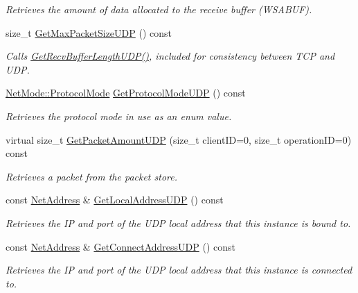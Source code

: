 \begin{DoxyCompactItemize}
\begin{DoxyCompactList}\small\item\em Retrieves the amount of data allocated to the receive buffer (WSABUF). \item\end{DoxyCompactList}\item 
size\_\-t \hyperlink{class_net_instance_u_d_p_a2b6f907521cb66fd707d069a62f7c36e}{GetMaxPacketSizeUDP} () const 
\begin{DoxyCompactList}\small\item\em Calls \hyperlink{class_net_instance_u_d_p_a4467dd45f0ae82b2c4721a3b04dd3746}{GetRecvBufferLengthUDP()}, included for consistency between TCP and UDP. \item\end{DoxyCompactList}\item 
\hyperlink{class_net_mode_a43cfa55ee6a4db66a8d7d6c27f766964}{NetMode::ProtocolMode} \hyperlink{class_net_instance_u_d_p_a52102ab4743e54c79d882d03253f4fb1}{GetProtocolModeUDP} () const 
\begin{DoxyCompactList}\small\item\em Retrieves the protocol mode in use as an enum value. \item\end{DoxyCompactList}\item 
virtual size\_\-t \hyperlink{class_net_instance_u_d_p_ad05e4432695514b0c960558c9393bc20}{GetPacketAmountUDP} (size\_\-t clientID=0, size\_\-t operationID=0) const 
\begin{DoxyCompactList}\small\item\em Retrieves a packet from the packet store. \item\end{DoxyCompactList}\item 
const \hyperlink{class_net_address}{NetAddress} \& \hyperlink{class_net_instance_u_d_p_acbfdacd929c7b332ec2b7b621df20051}{GetLocalAddressUDP} () const 
\begin{DoxyCompactList}\small\item\em Retrieves the IP and port of the UDP local address that this instance is bound to. \item\end{DoxyCompactList}\item 
const \hyperlink{class_net_address}{NetAddress} \& \hyperlink{class_net_instance_u_d_p_ac774933fd092e8454517e7e85aaecd45}{GetConnectAddressUDP} () const 
\begin{DoxyCompactList}\small\item\em Retrieves the IP and port of the UDP local address that this instance is connected to. \item\end{DoxyCompactList}\item 

\end{DoxyCompactItemize}
